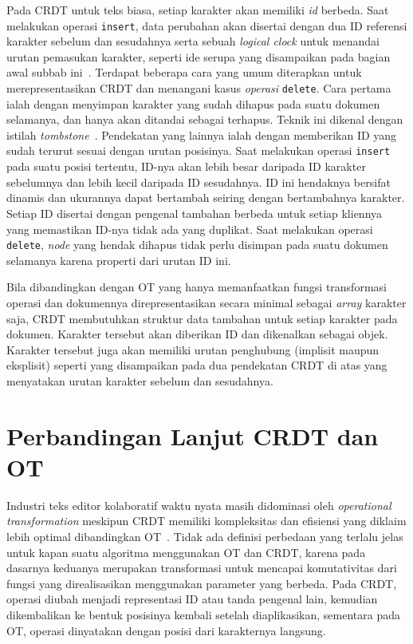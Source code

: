 Pada CRDT untuk teks biasa, setiap karakter akan memiliki \textit{id} berbeda. Saat melakukan operasi \texttt{insert}, data perubahan akan disertai dengan dua ID referensi karakter sebelum dan sesudahnya serta sebuah \textit{logical clock} untuk menandai urutan pemasukan karakter, seperti ide serupa yang disampaikan pada bagian awal subbab ini~\citep{oster2005real}. Terdapat beberapa cara yang umum diterapkan untuk merepresentasikan CRDT dan menangani kasus \textit{operasi} \texttt{delete}. Cara pertama ialah dengan menyimpan karakter yang sudah dihapus pada suatu dokumen selamanya, dan hanya akan ditandai sebagai terhapus. Teknik ini dikenal dengan istilah \textit{tombstone}~\citep{molli2006tombstone}. Pendekatan yang lainnya ialah dengan memberikan ID yang sudah terurut sesuai dengan urutan posisinya. Saat melakukan operasi \texttt{insert} pada suatu posisi tertentu, ID-nya akan lebih besar daripada ID karakter sebelumnya dan lebih kecil daripada ID sesudahnya. ID ini hendaknya bersifat dinamis dan ukurannya dapat bertambah seiring dengan bertambahnya karakter. Setiap ID disertai dengan pengenal tambahan berbeda untuk setiap kliennya yang memastikan ID-nya tidak ada yang duplikat. Saat melakukan operasi \texttt{delete}, \textit{node} yang hendak dihapus tidak perlu disimpan pada suatu dokumen selamanya karena properti dari urutan ID ini.

Bila dibandingkan dengan OT yang hanya memanfaatkan fungsi transformasi operasi dan dokumennya direpresentasikan secara minimal sebagai \textit{array} karakter saja, CRDT membutuhkan struktur data tambahan untuk setiap karakter pada dokumen. Karakter tersebut akan diberikan ID dan dikenalkan sebagai objek. Karakter tersebut juga akan memiliki urutan penghubung (implisit maupun eksplisit) seperti yang disampaikan pada dua pendekatan CRDT di atas yang menyatakan urutan karakter sebelum dan sesudahnya.

\section{Perbandingan Lanjut CRDT dan OT}
\label{sec:perbandingan}

Industri teks editor kolaboratif waktu nyata masih didominasi oleh \textit{operational transformation} meskipun CRDT memiliki kompleksitas dan efisiensi yang diklaim lebih optimal dibandingkan OT~\citep{Sun2019third}. Tidak ada definisi perbedaan yang terlalu jelas untuk kapan suatu algoritma menggunakan OT dan CRDT, karena pada dasarnya keduanya merupakan transformasi untuk mencapai komutativitas dari fungsi yang direalisasikan menggunakan parameter yang berbeda. Pada CRDT, operasi diubah menjadi representasi ID atau tanda pengenal lain, kemudian dikembalikan ke bentuk posisinya kembali setelah diaplikasikan, sementara pada OT, operasi dinyatakan dengan posisi dari karakternya langsung.

